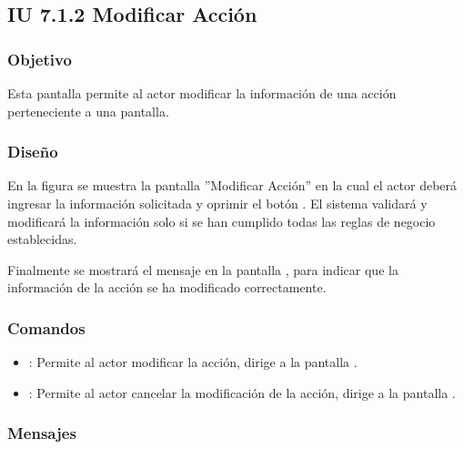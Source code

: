 \subsection{IU 7.1.2 Modificar Acción}

\subsubsection{Objetivo}
	Esta pantalla permite al actor modificar la información de una acción perteneciente a una pantalla.
\subsubsection{Diseño}
	En la figura  se muestra la pantalla ''Modificar Acción'' en la cual el actor deberá ingresar la información solicitada y oprimir el botón  . El sistema validará y modificará la información solo si se han cumplido todas las reglas de negocio establecidas.
	
	Finalmente se mostrará el mensaje  en la pantalla , para indicar que la información de la acción se ha modificado correctamente.

\subsubsection{Comandos}
\begin{itemize}
	\item {}: Permite al actor modificar la acción, dirige a la pantalla .
	\item {}: Permite al actor cancelar la modificación de la acción, dirige a la pantalla .
\end{itemize}

\subsubsection{Mensajes}

